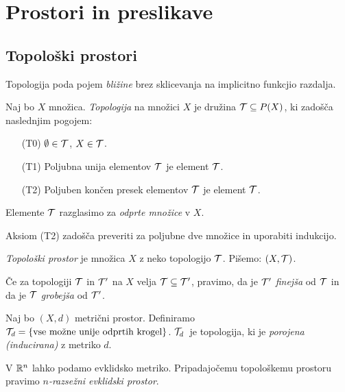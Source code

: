 \section{Prostori in preslikave}
\subsection{Topološki prostori}
Topologija poda pojem \emph{bližine} brez sklicevanja na implicitno funkcjio razdalja.

\begin{definicija}
    Naj bo $X$ množica. \emph{Topologija} na množici $X$ je družina $\mathcal{T} \subseteq P(X)$, ki zadošča naslednjim pogojem:
    \begin{enumerate}
        \item[(T0)] $\emptyset \in \mathcal{T}$, $X \in \mathcal{T}$.
        \item[(T1)] Poljubna unija elementov $\mathcal{T}$ je element $\mathcal{T}$.
        \item[(T2)] Poljuben končen presek elementov $\mathcal{T}$ je element $\mathcal{T}$.
    \end{enumerate}
    Elemente $\mathcal{T}$ razglasimo za \emph{odprte množice} v $X$.
\end{definicija}

\begin{opomba}
    Aksiom (T2) zadošča preveriti za poljubne dve množice in uporabiti indukcijo.
\end{opomba}

\begin{definicija}
    \emph{Topološki prostor} je množica $X$ z neko topologijo $\mathcal{T}$. Pišemo: $(X, \mathcal{T})$.
\end{definicija}

\begin{definicija}
    Če za topologiji $\mathcal{T}$ in $\mathcal{T}'$ na $X$ velja $\mathcal{T} \subseteq \mathcal{T}'$, pravimo, da je $\mathcal{T}'$ \emph{finejša} od $\mathcal{T}$ in da je $\mathcal{T}$ \emph{grobejša} od $\mathcal{T}'$. 
\end{definicija}

\begin{primer}
    Naj bo $(X, d)$ metrični prostor. Definiramo $\mathcal{T}_d = \left\{\text{vse možne unije odprtih krogel}\right\}$. $\mathcal{T}_d$~je topologija, ki je \emph{porojena (inducirana)} z metriko $d$.
\end{primer}

\begin{primer}
    V $\mathbb{R}^n$ lahko podamo evklidsko metriko. Pripadajočemu topološkemu prostoru pravimo \emph{$n$-razsežni evklidski prostor}.
\end{primer}

